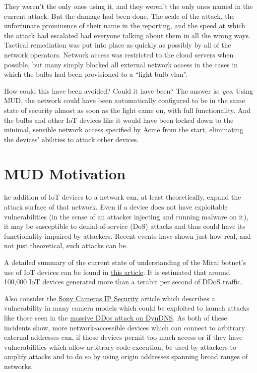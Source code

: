 \documentclass[conference]{IEEEtran}
\begin{document}
{They weren't the only ones using it, and they weren't the only ones
named in the current attack.  But the damage had been done.  The scale
of the attack, the unfortunate prominence of their name in the
reporting, and the speed at which the attack had escalated had
everyone talking about them in all the wrong ways.  Tactical
remediation was put into place as quickly as possibly by all of the
network operators.  Network access was restricted to the cloud servers
when possible, but many simply blocked all external network access in
the cases in which the bulbs had been provisioned to a ``light bulb
vlan''.

How could this have been avoided?  Could it have been?  The answer is:
{\em yes}.  Using MUD, the network could have been automatically
configured to be in the same state of security almost as soon as the
light came on, with full functionality.  And the bulbs and other IoT
devices like it would have been locked down to the minimal, sensible
network access specified by Acme from the start, eliminating the
devices' abilities to attack other devices.
}

\section{MUD Motivation}
\iftoggle{industry}{%
As the anecdote above showed, t}{T}he addition of IoT devices to a network
can, at least theoretically, expand the attack surface of that
network.  Even if a device does not have exploitable vulnerabilities
(in the sense of an attacker injecting and running malware on it), it
may be susceptible to denial-of-service (DoS) attacks and thus could
have its functionality impaired by attackers.  Recent events have
shown just how real, and not just theoretical, such attacks can be.

A detailed summary of the current state of understanding of the Mirai
botnet's use of IoT devices can be found in
\href{https://www.flashpoint-intel.com/action-analysis-mirai-botnet-attacks-dyn/}{this
article}.  It is estimated that around 100,000 IoT devices generated
more than a terabit per second of DDoS traffic.

Also consider the
\href{http://www.pcworld.com/article/3147311/security/backdoor-accounts-found-in-80-sony-ip-security-camera-models.html}{Sony
Cameras IP Security} article which describes a vulnerability in many
camera models which could be exploited to launch attacks like those
seen in the
\href{http://www.pcworld.com/article/3134056/hacking/an-iot-botnet-is-partly-behind-fridays-massive-ddos-attack.html}{massive
DDos attack on DynDNS}.  As both of these incidents show, more
network-accessible devices which can connect to arbitrary external
addresses can, if those devices permit too much access or if they have
vulnerabilities which allow arbitrary code execution, be used by
attackers to amplify attacks and to do so by using origin addresses
spanning broad ranges of networks.
\end{document}
